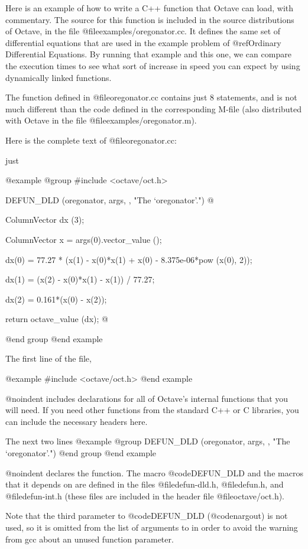 Here is an example of how to write a C++ function that Octave can load,
with commentary.  The source for this function is included in the source
distributions of Octave, in the file @file{examples/oregonator.cc}.  It
defines the same set of differential equations that are used in the
example problem of @ref{Ordinary Differential Equations}.  By running
that example and this one, we can compare the execution times to see
what sort of increase in speed you can expect by using dynamically
linked functions.

The function defined in @file{oregonator.cc} contains just 8 statements,
and is not much different than the code defined in the corresponding
M-file (also distributed with Octave in the file
@file{examples/oregonator.m}).

Here is the complete text of @file{oregonator.cc}:

just

@example
@group
#include <octave/oct.h>

DEFUN_DLD (oregonator, args, ,
  "The `oregonator'.")
@{
  ColumnVector dx (3);

  ColumnVector x = args(0).vector_value ();

  dx(0) = 77.27 * (x(1) - x(0)*x(1) + x(0)
                   - 8.375e-06*pow (x(0), 2));

  dx(1) = (x(2) - x(0)*x(1) - x(1)) / 77.27;

  dx(2) = 0.161*(x(0) - x(2));

  return octave_value (dx);
@}
@end group
@end example

The first line of the file,

@example
#include <octave/oct.h>
@end example

@noindent
includes declarations for all of Octave's internal functions that you
will need.  If you need other functions from the standard C++ or C
libraries, you can include the necessary headers here.

The next two lines
@example
@group
DEFUN_DLD (oregonator, args, ,
  "The `oregonator'.")
@end group
@end example

@noindent
declares the function.  The macro @code{DEFUN_DLD} and the macros that
it depends on are defined in the files @file{defun-dld.h},
@file{defun.h}, and @file{defun-int.h} (these files are included in the
header file @file{octave/oct.h}).

Note that the third parameter to @code{DEFUN_DLD} (@code{nargout}) is
not used, so it is omitted from the list of arguments to in order to
avoid  the warning from gcc about an unused function parameter.

